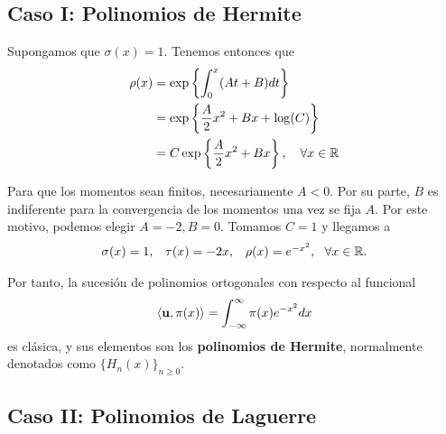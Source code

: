 \subsection{Caso I: Polinomios de Hermite}
\label{subsection:Hermite}

Supongamos que $\sigma(x)=1$. Tenemos entonces que
\begin{equation*}
    \begin{split}
        \rho(x) &= \exp\left\{ \int_0^x (At+B)dt \right\}\\
        &= \exp\left\{ \dfrac{A}{2}x^2+Bx+\log(C) \right\} \\
        &= C \exp\left\{ \dfrac{A}{2}x^2+Bx \right\}, \ \ \ \forall x\in\mathbb{R}
    \end{split}
\end{equation*}

Para que los momentos sean finitos, necesariamente $A<0$. Por su parte, $B$ es indiferente para la convergencia de los momentos una vez se fija $A$. Por este motivo, podemos elegir $A=-2, B=0$. Tomamos $C=1$ y llegamos a 
\begin{equation}
    \label{eq:parametros-hermite}
    \begin{array}{ccc}
        \sigma(x)=1, & \tau(x)=-2x, & \rho(x) = e^{-x^2}, \ \ \forall x \in \R.
    \end{array}
\end{equation}

Por tanto, la sucesión de polinomios ortogonales con respecto al funcional
\begin{equation}
    \label{eq:func-hermite}
    \left\langle \mathbf{u} , \pi(x) \right\rangle = \int_{-\infty}^\infty \pi(x)e^{-x^2}dx
\end{equation}
es clásica, y sus elementos son los \textbf{polinomios de Hermite}, normalmente denotados como $\{H_n(x)\}_{n\geq 0}$.

\subsection{Caso II: Polinomios de Laguerre}

